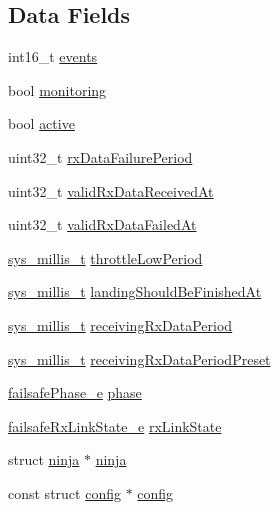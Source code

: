 \subsection*{Data Fields}
\begin{DoxyCompactItemize}
\item 
int16\+\_\+t \hyperlink{structfailsafe_ab61bccb24bb84bd336703f788ba95402}{events}
\item 
bool \hyperlink{structfailsafe_a0d29bdd14fec13b3811740242f1db6ae}{monitoring}
\item 
bool \hyperlink{structfailsafe_a4f7fe0d7138c8042eedaf4dc1e62cbc9}{active}
\item 
uint32\+\_\+t \hyperlink{structfailsafe_aefb8e7f9cee5f3f88590e69105ddd592}{rx\+Data\+Failure\+Period}
\item 
uint32\+\_\+t \hyperlink{structfailsafe_a2697d9428c0ffc03a2eab4c664253e89}{valid\+Rx\+Data\+Received\+At}
\item 
uint32\+\_\+t \hyperlink{structfailsafe_ad4a10974833eccd3d7ffc88f5df60217}{valid\+Rx\+Data\+Failed\+At}
\item 
\hyperlink{system__calls_8h_a62a9a2e72861132c17d4d4b29bb8b80a}{sys\+\_\+millis\+\_\+t} \hyperlink{structfailsafe_ac476e200aabbbd5ea074c861a766214c}{throttle\+Low\+Period}
\item 
\hyperlink{system__calls_8h_a62a9a2e72861132c17d4d4b29bb8b80a}{sys\+\_\+millis\+\_\+t} \hyperlink{structfailsafe_a6592a05658dbb0ac38976a89c0387e36}{landing\+Should\+Be\+Finished\+At}
\item 
\hyperlink{system__calls_8h_a62a9a2e72861132c17d4d4b29bb8b80a}{sys\+\_\+millis\+\_\+t} \hyperlink{structfailsafe_a6a48c4335cd09a4409bba7773aeb724e}{receiving\+Rx\+Data\+Period}
\item 
\hyperlink{system__calls_8h_a62a9a2e72861132c17d4d4b29bb8b80a}{sys\+\_\+millis\+\_\+t} \hyperlink{structfailsafe_ab17287e520198750a3b109bc5151b408}{receiving\+Rx\+Data\+Period\+Preset}
\item 
\hyperlink{flight_2failsafe_8h_ac818cdd9595e16dec1248366ceee914d}{failsafe\+Phase\+\_\+e} \hyperlink{structfailsafe_ab0418135d1db3ed90d35412c94c7c7e7}{phase}
\item 
\hyperlink{flight_2failsafe_8h_a87da93a7d0bf77ce89ebc237b35f9663}{failsafe\+Rx\+Link\+State\+\_\+e} \hyperlink{structfailsafe_a3e6c21f8fb7c3eccad8e5c6063fc6b2d}{rx\+Link\+State}
\item 
struct \hyperlink{structninja}{ninja} $\ast$ \hyperlink{structfailsafe_a77b0679a1533f438af97a87d68ebd66b}{ninja}
\item 
const struct \hyperlink{structconfig}{config} $\ast$ \hyperlink{structfailsafe_a25f186b5f6631cc0fc8811a9f03125b5}{config}
\end{DoxyCompactItemize}


